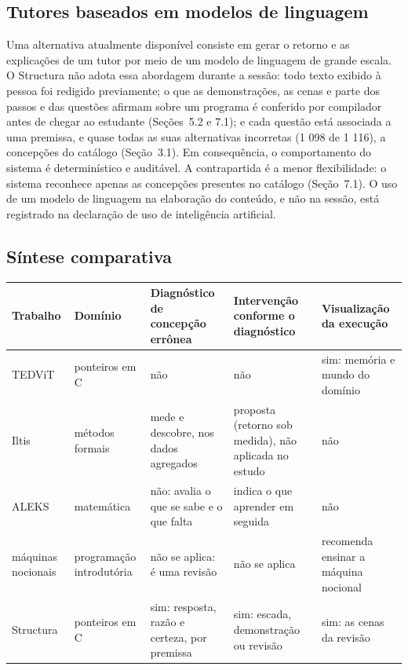 \subsection{Tutores baseados em modelos de linguagem}

Uma alternativa atualmente disponível consiste em gerar o retorno e as explicações de um tutor por meio de um modelo de linguagem de grande escala. O Structura não adota essa abordagem durante a sessão: todo texto exibido à pessoa foi redigido previamente; o que as demonstrações, as cenas e parte dos passos e das questões afirmam sobre um programa é conferido por compilador antes de chegar ao estudante (Seções~5.2 e 7.1); e cada questão está associada a uma premissa, e quase todas as suas alternativas incorretas (1 098 de 1 116), a concepções do catálogo (Seção~3.1). Em consequência, o comportamento do sistema é determinístico e auditável. A contrapartida é a menor flexibilidade: o sistema reconhece apenas as concepções presentes no catálogo (Seção~7.1). O uso de um modelo de linguagem na elaboração do conteúdo, e não na sessão, está registrado na declaração de uso de inteligência artificial.

\subsection{Síntese comparativa}

\begin{quadro}[htbp]
\caption{Comparação entre os trabalhos relacionados e o Structura}\label{qua:2-1}
\footnotesize
\begin{tabularx}{\textwidth}{|X|X|X|X|X|}
\hline
\textbf{Trabalho} & \textbf{Domínio} & \textbf{Diagnóstico de concepção errônea} & \textbf{Intervenção conforme o diagnóstico} & \textbf{Visualização da execução} \\ \hline
TEDViT & ponteiros em C & não & não & sim: memória e mundo do domínio \\ \hline
Iltis & métodos formais & mede e descobre, nos dados agregados & proposta (retorno sob medida), não aplicada no estudo & não \\ \hline
ALEKS & matemática & não: avalia o que se sabe e o que falta & indica o que aprender em seguida & não \\ \hline
máquinas nocionais & programação introdutória & não se aplica: é uma revisão & não se aplica & recomenda ensinar a máquina nocional \\ \hline
Structura & ponteiros em C & sim: resposta, razão e certeza, por premissa & sim: escada, demonstração ou revisão & sim: as cenas da revisão \\ \hline
\end{tabularx}
\end{quadro}

